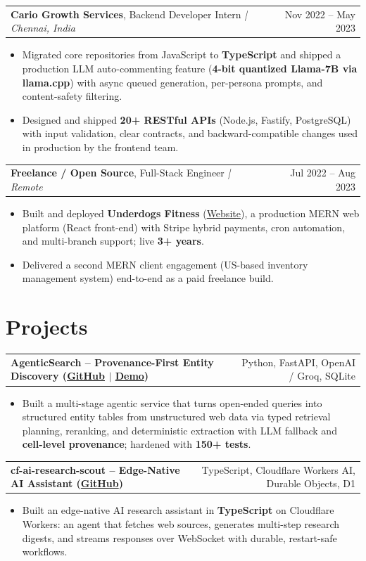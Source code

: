 \documentclass[letterpaper,11pt]{article}
\makeatletter
\newcommand{\expItem}[4]{%
  \vspace{2pt}
  \begin{tabular*}{\textwidth}{@{}l@{\extracolsep{\fill}}r@{}}
    \textbf{#1}, #2 \textit{| #3} & #4 \\
  \end{tabular*}\par\vspace{-2pt}
}
\newcommand{\projItem}[2]{%
  \vspace{4pt}
  \begin{tabular*}{\textwidth}{@{}l@{\extracolsep{\fill}}r@{}}
    \textbf{#1} & #2 \\
  \end{tabular*}\par\vspace{-2pt}
}
\makeatother
\begin{document}
\expItem{Cario Growth Services}{Backend Developer Intern}{Chennai, India}{Nov 2022 -- May 2023}
\begin{itemize}
  \item Migrated core repositories from JavaScript to \textbf{TypeScript} and shipped a production LLM auto-commenting feature (\textbf{4-bit quantized Llama-7B via llama.cpp}) with async queued generation, per-persona prompts, and content-safety filtering.
  \item Designed and shipped \textbf{20+ RESTful APIs} (Node.js, Fastify, PostgreSQL) with input validation, clear contracts, and backward-compatible changes used in production by the frontend team.
\end{itemize}

\expItem{Freelance / Open Source}{Full-Stack Engineer}{Remote}{Jul 2022 -- Aug 2023}
\begin{itemize}
  \item Built and deployed \textbf{Underdogs Fitness} (\href{https://www.underdogsfitness.in/}{Website}), a production MERN web platform (React front-end) with Stripe hybrid payments, cron automation, and multi-branch support; live \textbf{3+ years}.
  \item Delivered a second MERN client engagement (US-based inventory management system) end-to-end as a paid freelance build.
\end{itemize}

\section{Projects}

\projItem{AgenticSearch -- Provenance-First Entity Discovery {\normalfont\small(\href{https://github.com/Deva-1903/ciir_agentic_search}{GitHub} $\vert$ \href{https://agentic-search-negglszkwa-uc.a.run.app}{Demo})}}{Python, FastAPI, OpenAI / Groq, SQLite}
\begin{itemize}
  \item Built a multi-stage agentic service that turns open-ended queries into structured entity tables from unstructured web data via typed retrieval planning, reranking, and deterministic extraction with LLM fallback and \textbf{cell-level provenance}; hardened with \textbf{150+ tests}.
\end{itemize}

\projItem{cf-ai-research-scout -- Edge-Native AI Assistant {\normalfont\small(\href{https://github.com/Deva-1903/cf_ai_research_scout}{GitHub})}}{TypeScript, Cloudflare Workers AI, Durable Objects, D1}
\begin{itemize}
  \item Built an edge-native AI research assistant in \textbf{TypeScript} on Cloudflare Workers: an agent that fetches web sources, generates multi-step research digests, and streams responses over WebSocket with durable, restart-safe workflows.
\end{itemize}
\end{document}
